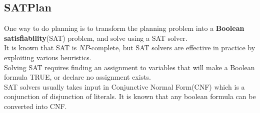 \documentclass[12pt]{article}
\theoremstyle{definition}
\begin{document}
\subsection{SATPlan}
One way to do planning is to transform the planning problem into a \textbf{Boolean satisfiability}(SAT) problem, and solve using a SAT solver.\\
It is known that SAT is $NP$-complete, but SAT solvers are effective in practice by exploiting various heuristics.\\

Solving SAT requires finding an assignment to variables that will make a Boolean formula TRUE, or declare no assignment exists.\\

SAT solvers usually takes input in Conjunctive Normal Form(CNF) which is a conjunction of disjunction of literals. It is known that any boolean formula can be converted into CNF.
\end{document}
